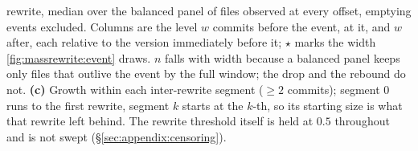 \begin{table}[t]
{    rewrite, median over the balanced panel of files observed at every offset, emptying events
    excluded. Columns are the level $w$ commits before the event, at it, and $w$ after, each
    relative to the version immediately before it; $\star$ marks the width
    \autoref{fig:massrewrite:event} draws. $n$ falls with width because a balanced panel keeps
    only files that outlive the event by the full window; the drop and the rebound do not.
    \textbf{(c)} Growth within each
    inter-rewrite segment ($\ge 2$ commits); segment $0$ runs to the first rewrite, segment $k$
    starts at the $k$-th, so its starting size is what that rewrite left behind. The rewrite
    threshold itself is held at $0.5$ throughout and is not swept (\S\ref{sec:appendix:censoring}).
  }
  \label{tab:rewrite}
\end{table}
